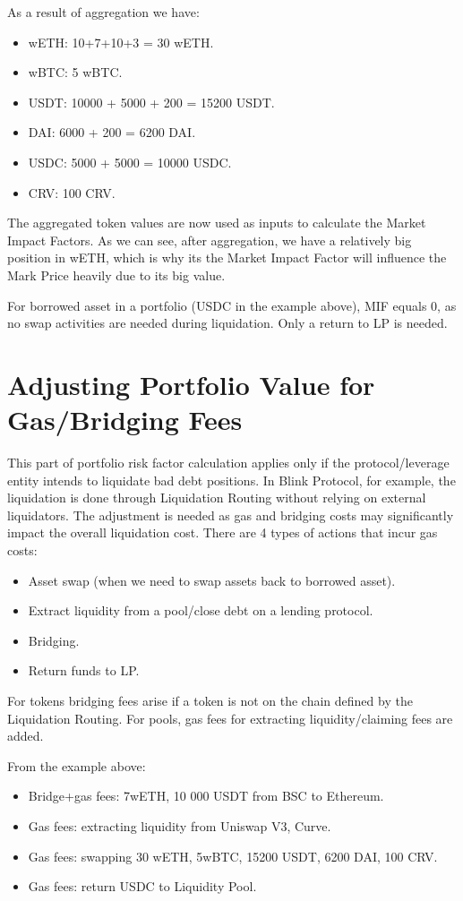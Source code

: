 \documentclass[conference]{IEEEtran}
\begin{document}
As a result of aggregation we have:
\begin{itemize}
	\item wETH: 10+7+10+3 = 30 wETH.
	\item wBTC: 5 wBTC.
	\item USDT: 10000 + 5000 + 200 = 15200 USDT.
	\item DAI: 6000 + 200 = 6200 DAI.
	\item USDC: 5000 + 5000 = 10000 USDC.
	\item CRV: 100 CRV.
\end{itemize}

The aggregated token values are now used as inputs to calculate the Market Impact Factors. As we can see, after aggregation, we have a relatively big position in wETH, which is why its the Market Impact Factor will influence the Mark Price heavily due to its big value.

For borrowed asset in a portfolio (USDC in the example above), MIF equals 0, as no swap activities are needed during liquidation. Only a return to LP is needed.

\section{Adjusting Portfolio Value for Gas/Bridging Fees}
This part of portfolio risk factor calculation applies only if the protocol/leverage entity intends to liquidate bad debt positions. In Blink Protocol, for example, the liquidation is done through Liquidation Routing without relying on external liquidators. The adjustment is needed as gas and bridging costs may significantly impact the overall liquidation cost. There are 4 types of actions that incur gas costs:

\begin{itemize}
	\item Asset swap (when we need to swap assets back to borrowed asset).
	\item Extract liquidity from a pool/close debt on a lending protocol.
	\item Bridging.
	\item Return funds to LP.
\end{itemize}

For tokens bridging fees arise if a token is not on the chain defined by the Liquidation Routing. For pools, gas fees for extracting liquidity/claiming fees are added.

From the example above:
\begin{itemize}
	\item Bridge+gas fees: 7wETH, 10 000 USDT from BSC to Ethereum.
	\item Gas fees: extracting liquidity from Uniswap V3, Curve.
	\item Gas fees: swapping 30 wETH, 5wBTC, 15200 USDT, 6200 DAI,  100 CRV.
	\item Gas fees: return USDC to Liquidity Pool.
\end{itemize}
\end{document}
